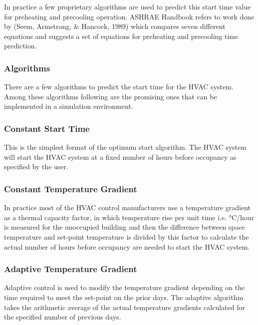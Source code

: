 In practice a few proprietary algorithms are used to predict this start time value for preheating and precooling operation. ASHRAE Handbook refers to work done by (Seem, Armstrong, \& Hancock, 1989) which compares seven different equations and suggests a set of equations for preheating and precooling time prediction.

\subsubsection{Algorithms}\label{algorithms}

There are a few algorithms to predict the start time for the HVAC system. Among these algorithms following are the promising ones that can be implemented in a simulation environment.

\subsubsection{Constant Start Time}\label{constant-start-time}

This is the simplest format of the optimum start algorithm. The HVAC system will start the HVAC system at a fixed number of hours before occupancy as specified by the user.

\subsubsection{Constant Temperature Gradient}\label{constant-temperature-gradient}

In practice most of the HVAC control manufacturers use a temperature gradient as a thermal capacity factor, in which temperature rise per unit time i.e. °C/hour is measured for the unoccupied building and then the difference between space temperature and set-point temperature is divided by this factor to calculate the actual number of hours before occupancy are needed to start the HVAC system.

\subsubsection{Adaptive Temperature Gradient}\label{adaptive-temperature-gradient}

Adaptive control is used to modify the temperature gradient depending on the time required to meet the set-point on the prior days. The adaptive algorithm takes the arithmetic average of the actual temperature gradients calculated for the specified number of previous days.

